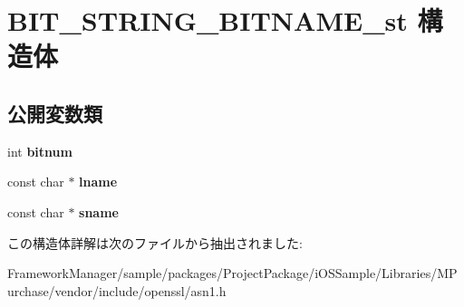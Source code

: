 \hypertarget{struct_b_i_t___s_t_r_i_n_g___b_i_t_n_a_m_e__st}{}\section{B\+I\+T\+\_\+\+S\+T\+R\+I\+N\+G\+\_\+\+B\+I\+T\+N\+A\+M\+E\+\_\+st 構造体}
\label{struct_b_i_t___s_t_r_i_n_g___b_i_t_n_a_m_e__st}
\subsection*{公開変数類}
\begin{DoxyCompactItemize}
\item 
\hypertarget{struct_b_i_t___s_t_r_i_n_g___b_i_t_n_a_m_e__st_adbddb7cc8584fbb8ae3803eb6d54eec8}{}int {\bfseries bitnum}\label{struct_b_i_t___s_t_r_i_n_g___b_i_t_n_a_m_e__st_adbddb7cc8584fbb8ae3803eb6d54eec8}

\item 
\hypertarget{struct_b_i_t___s_t_r_i_n_g___b_i_t_n_a_m_e__st_a7b6403eb8f9e092395526bd981150531}{}const char $\ast$ {\bfseries lname}\label{struct_b_i_t___s_t_r_i_n_g___b_i_t_n_a_m_e__st_a7b6403eb8f9e092395526bd981150531}

\item 
\hypertarget{struct_b_i_t___s_t_r_i_n_g___b_i_t_n_a_m_e__st_a78a12a66f7da99aeb5e7a3b07cc411cf}{}const char $\ast$ {\bfseries sname}\label{struct_b_i_t___s_t_r_i_n_g___b_i_t_n_a_m_e__st_a78a12a66f7da99aeb5e7a3b07cc411cf}

\end{DoxyCompactItemize}


この構造体詳解は次のファイルから抽出されました\+:\begin{DoxyCompactItemize}
\item 
Framework\+Manager/sample/packages/\+Project\+Package/i\+O\+S\+Sample/\+Libraries/\+M\+Purchase/vendor/include/openssl/asn1.\+h\end{DoxyCompactItemize}
